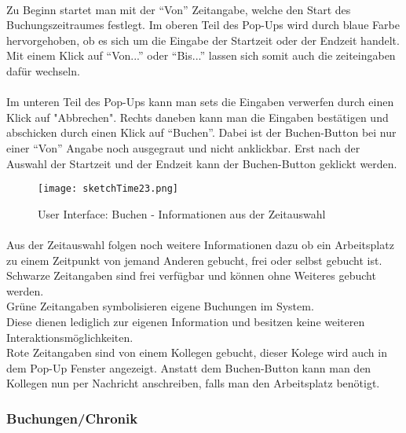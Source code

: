 \paragraph{} Zu Beginn startet man mit der "`Von"' Zeitangabe, welche den Start des Buchungszeitraumes festlegt. 
Im oberen Teil des Pop-Ups wird durch blaue Farbe hervorgehoben, ob es sich um die Eingabe der Startzeit oder der Endzeit handelt.
Mit einem Klick auf "`Von..."' oder "`Bis..."' lassen sich somit auch die zeiteingaben dafür wechseln. 

\paragraph{}Im unteren Teil des Pop-Ups kann man sets die Eingaben verwerfen durch einen Klick auf "Abbrechen".
Rechts daneben kann man die Eingaben bestätigen und abschicken durch einen Klick auf "`Buchen"'.
Dabei ist der Buchen-Button bei nur einer "`Von"' Angabe noch ausgegraut und nicht anklickbar.
Erst nach der Auswahl der Startzeit und der Endzeit kann der Buchen-Button geklickt werden.

\begin{figure}[!h]
  \centering
  \texttt{[image: sketchTime23.png]}
  \caption{User Interface: Buchen - Informationen aus der Zeitauswahl}
  \label{fig:sketch_time_23}
\end{figure}

\paragraph{}Aus der Zeitauswahl folgen noch weitere Informationen dazu ob ein Arbeitsplatz zu einem Zeitpunkt von jemand Anderen gebucht, frei oder selbst gebucht ist. \\
Schwarze Zeitangaben sind frei verfügbar und können ohne Weiteres gebucht werden. \\
Grüne Zeitangaben symbolisieren eigene Buchungen im System. \\
Diese dienen lediglich zur eigenen Information und besitzen keine weiteren Interaktionsmöglichkeiten.\\
Rote Zeitangaben sind von einem Kollegen gebucht, dieser Kolege wird auch in dem Pop-Up Fenster angezeigt.
Anstatt dem Buchen-Button kann man den Kollegen nun per Nachricht anschreiben, falls man den Arbeitsplatz benötigt. 

\newpage
\subsubsection{Buchungen/Chronik}

